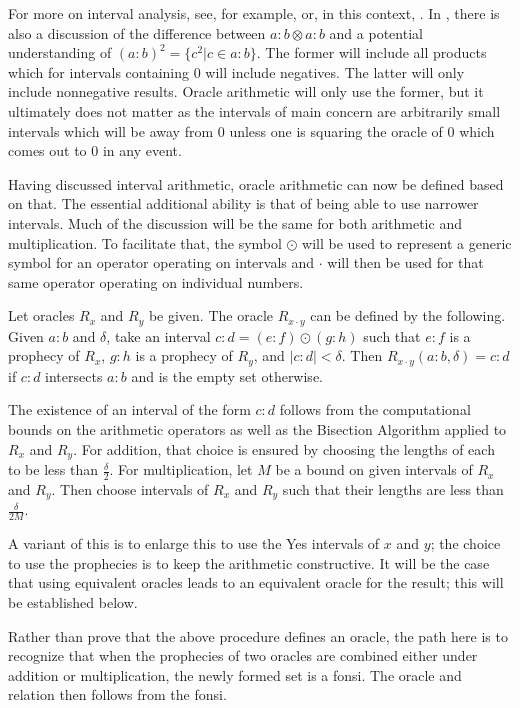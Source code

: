 \documentclass[12pt]{article}
\begin{document}
For more on interval analysis, see, for example, \cite{moore} or, in this context, \cite{taylor23main}. In \cite{moore}, there is also a discussion of the difference between $a:b \otimes a:b$ and a potential understanding of $(a:b)^2 = \{c^2 | c \in a:b\}$. The former will include all products which for intervals containing 0 will include negatives. The latter will only include nonnegative results. Oracle arithmetic will only use the former, but it ultimately does not matter as the intervals of main concern are arbitrarily small intervals which will be away from 0 unless one is squaring the oracle of 0 which comes out to 0 in any event.  

Having discussed interval arithmetic, oracle arithmetic can now be defined based on that. The essential additional ability is that of being able to use narrower intervals. Much of the discussion will be the same for both arithmetic and multiplication. To facilitate that, the symbol $\odot$ will be used to represent a generic symbol for an operator operating on intervals and $\cdot$ will then be used for that same operator operating on individual numbers.

Let oracles $R_x$ and $R_y$ be given. The oracle $R_{x \cdot y}$ can be defined by the following. Given $a:b$ and $\delta$, take an interval $c:d = (e:f) \odot (g:h)$ such that $e:f$ is a prophecy of $R_x$, $g:h$ is a prophecy of $R_y$, and $|c:d| < \delta$. Then $R_{x \cdot y}(a:b, \delta) = c:d$ if $c:d$ intersects $a:b$ and is the empty set otherwise. 

The existence of an interval of the form $c:d$ follows from the computational bounds on the arithmetic operators as well as the Bisection Algorithm applied to $R_x$ and $R_y$. For addition, that choice is ensured by choosing the lengths of each to be less than $\frac{\delta}{2}$. For multiplication, let $M$ be a bound on given intervals of $R_x$ and $R_y$. Then choose intervals of $R_x$ and $R_y$ such that their lengths are less than $\frac{\delta}{2M}$. 

A variant of this is to enlarge this to use the Yes intervals of $x$ and $y$; the choice to use the prophecies is to keep the arithmetic constructive. It will be the case that using equivalent oracles leads to an equivalent oracle for the result; this will be established below. 

Rather than prove that the above procedure defines an oracle, the path here is to recognize that when the prophecies of two oracles are combined either under addition or multiplication, the newly formed set is a fonsi. The oracle and relation then follows from the fonsi. 
\end{document}
